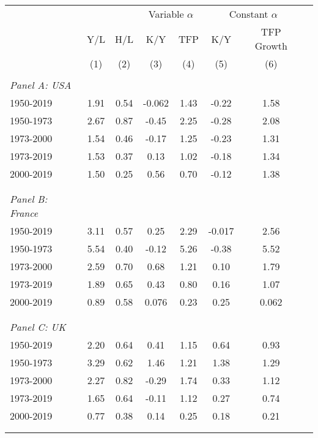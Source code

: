 \begin{tabular}{lccccccc}
\hline \hline
                    &\multicolumn{2}{c}{}     &\multicolumn{2}{c}{Variable $\alpha$}&\multicolumn{2}{c}{Constant $\alpha$}\\\cmidrule(lr){2-3}\cmidrule(lr){4-5}\cmidrule(lr){6-7}
                    &\multicolumn{1}{c}{Y/L}&\multicolumn{1}{c}{H/L}&\multicolumn{1}{c}{K/Y}&\multicolumn{1}{c}{TFP}&\multicolumn{1}{c}{K/Y}&\multicolumn{1}{c}{TFP Growth}\\
& (1) & (2) & (3) & (4) & (5) & (6) \\
\hline \\ 
\textit{Panel A: USA} \\
1950-2019           &        1.91&        0.54&      -0.062&        1.43&       -0.22&        1.58\\
1950-1973           &        2.67&        0.87&       -0.45&        2.25&       -0.28&        2.08\\
1973-2000           &        1.54&        0.46&       -0.17&        1.25&       -0.23&        1.31\\
1973-2019           &        1.53&        0.37&        0.13&        1.02&       -0.18&        1.34\\
2000-2019           &        1.50&        0.25&        0.56&        0.70&       -0.12&        1.38\\
\\ 
\hline \\ 

\textit{Panel B: France} \\
1950-2019           &        3.11&        0.57&        0.25&        2.29&      -0.017&        2.56\\
1950-1973           &        5.54&        0.40&       -0.12&        5.26&       -0.38&        5.52\\
1973-2000           &        2.59&        0.70&        0.68&        1.21&        0.10&        1.79\\
1973-2019           &        1.89&        0.65&        0.43&        0.80&        0.16&        1.07\\
2000-2019           &        0.89&        0.58&       0.076&        0.23&        0.25&       0.062\\
\\ 
\hline \\ 

\textit{Panel C: UK} \\
1950-2019           &        2.20&        0.64&        0.41&        1.15&        0.64&        0.93\\
1950-1973           &        3.29&        0.62&        1.46&        1.21&        1.38&        1.29\\
1973-2000           &        2.27&        0.82&       -0.29&        1.74&        0.33&        1.12\\
1973-2019           &        1.65&        0.64&       -0.11&        1.12&        0.27&        0.74\\
2000-2019           &        0.77&        0.38&        0.14&        0.25&        0.18&        0.21\\
\\ 
\hline \\ 


\end{tabular}
